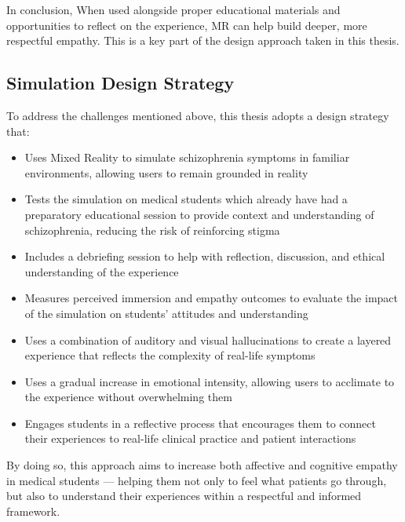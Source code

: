 In conclusion, When used alongside proper educational materials and opportunities to reflect on the experience, MR can help build deeper, more respectful empathy. This is a key part of the design approach taken in this thesis.


\subsection{Simulation Design Strategy}
To address the challenges mentioned above, this thesis adopts a design strategy that:

\begin{itemize}
    \item Uses Mixed Reality to simulate schizophrenia symptoms in familiar environments, allowing users to remain grounded in reality
    \item Tests the simulation on medical students which already have had a preparatory educational session to provide context and understanding of schizophrenia, reducing the risk of reinforcing stigma
    \item Includes a debriefing session to help with reflection, discussion, and ethical understanding of the experience
    \item Measures perceived immersion and empathy outcomes to evaluate the impact of the simulation on students' attitudes and understanding
    \item Uses a combination of auditory and visual hallucinations to create a layered experience that reflects the complexity of real-life symptoms
    \item Uses a gradual increase in emotional intensity, allowing users to acclimate to the experience without overwhelming them
    \item Engages students in a reflective process that encourages them to connect their experiences to real-life clinical practice and patient interactions
\end{itemize}

By doing so, this approach aims to increase both affective and cognitive empathy in medical students — helping them not only to feel what patients go through, but also to understand their experiences within a respectful and informed framework.
